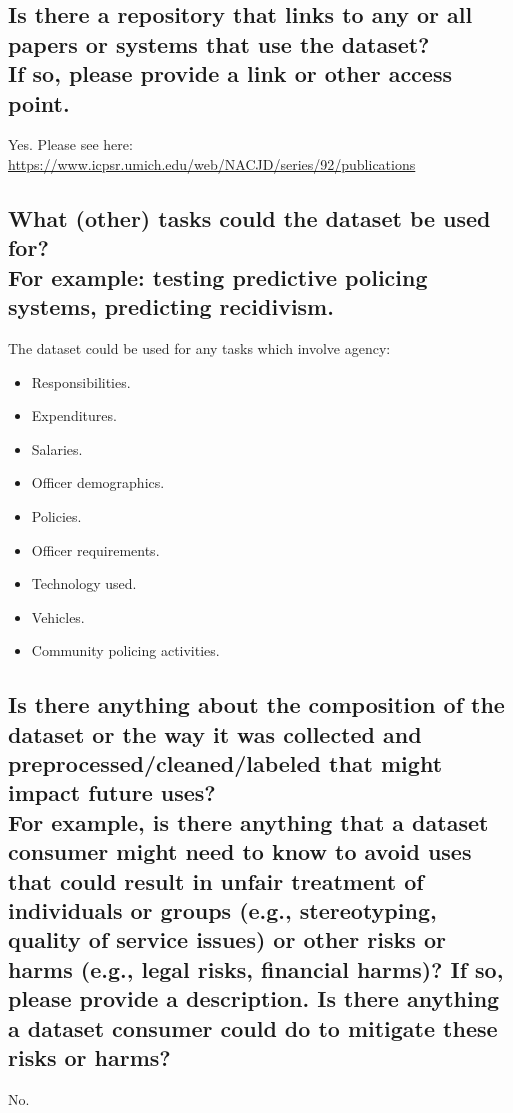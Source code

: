 \documentclass[letterpaper, 10 pt, conference]{ieeeconf}  %
\newcommand{\subtitle}[1]{{\\ \small \normalfont \color{purple} #1}}
\begin{document}
\subsection{Is there a repository that links to any or all papers or systems that use the dataset? \subtitle{If so, please provide a link or other access point. }}

Yes. Please see here: \\

\href{https://www.icpsr.umich.edu/web/NACJD/series/92/publications}{https://www.icpsr.umich.edu/web/NACJD/series/92/publications}

\subsection{What (other) tasks could the dataset be used for? \subtitle{For example: testing predictive policing systems, predicting recidivism.}}

The dataset could be used for any tasks which involve agency:
\begin{itemize}
    \item Responsibilities.
    \item Expenditures.
    \item Salaries.
    \item Officer demographics.
    \item Policies.
    \item Officer requirements.
    \item Technology used.
    \item Vehicles.
    \item Community policing activities.
\end{itemize}

\subsection{Is there anything about the composition of the dataset or the way it was collected and preprocessed/cleaned/labeled that might impact future uses? \subtitle{For example, is there anything that a dataset consumer might need to know to avoid uses that could result in unfair treatment of individuals or groups (e.g., stereotyping, quality of service issues) or other risks or harms (e.g., legal risks, financial harms)? If so, please provide a description. Is there anything a dataset consumer could do to mitigate these risks or harms?}}

No.
\end{document}
